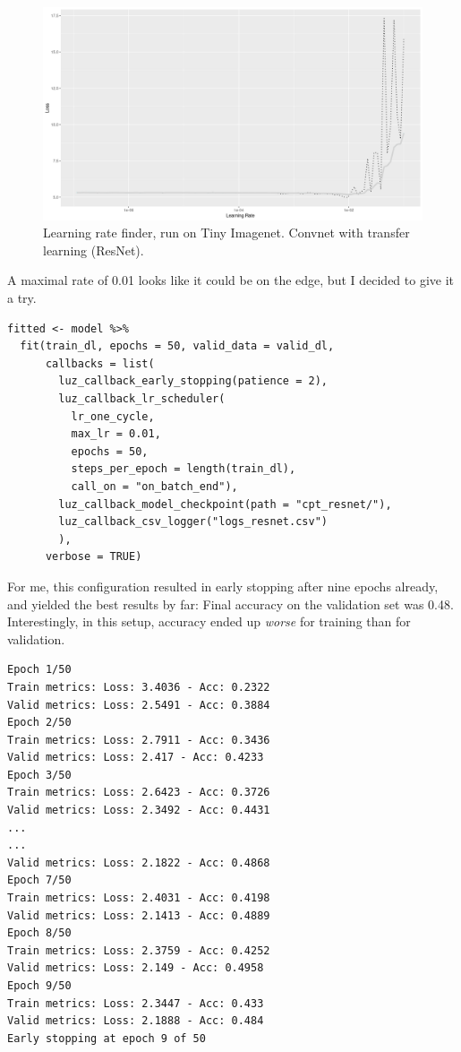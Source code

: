 \documentclass[
  letterpaper,
]{krantz}
\begin{document}
\begin{figure}[H]

{\centering \includegraphics{images/images2-lr-finder-resnet.png}

}

\caption{\label{fig-images2-lr-finder-resnet}Learning rate finder, run
on Tiny Imagenet. Convnet with transfer learning (ResNet).}

\end{figure}

A maximal rate of 0.01 looks like it could be on the edge, but I decided
to give it a try.

\begin{verbatim}
fitted <- model %>%
  fit(train_dl, epochs = 50, valid_data = valid_dl,
      callbacks = list(
        luz_callback_early_stopping(patience = 2),
        luz_callback_lr_scheduler(
          lr_one_cycle,
          max_lr = 0.01,
          epochs = 50,
          steps_per_epoch = length(train_dl),
          call_on = "on_batch_end"),
        luz_callback_model_checkpoint(path = "cpt_resnet/"),
        luz_callback_csv_logger("logs_resnet.csv")
        ),
      verbose = TRUE)
\end{verbatim}

For me, this configuration resulted in early stopping after nine epochs
already, and yielded the best results by far: Final accuracy on the
validation set was 0.48. Interestingly, in this setup, accuracy ended up
\emph{worse} for training than for validation.

\begin{verbatim}
Epoch 1/50
Train metrics: Loss: 3.4036 - Acc: 0.2322                                     
Valid metrics: Loss: 2.5491 - Acc: 0.3884
Epoch 2/50
Train metrics: Loss: 2.7911 - Acc: 0.3436                                     
Valid metrics: Loss: 2.417 - Acc: 0.4233
Epoch 3/50
Train metrics: Loss: 2.6423 - Acc: 0.3726                                     
Valid metrics: Loss: 2.3492 - Acc: 0.4431
...
...
Valid metrics: Loss: 2.1822 - Acc: 0.4868
Epoch 7/50
Train metrics: Loss: 2.4031 - Acc: 0.4198                                     
Valid metrics: Loss: 2.1413 - Acc: 0.4889
Epoch 8/50
Train metrics: Loss: 2.3759 - Acc: 0.4252                                     
Valid metrics: Loss: 2.149 - Acc: 0.4958
Epoch 9/50
Train metrics: Loss: 2.3447 - Acc: 0.433                                      
Valid metrics: Loss: 2.1888 - Acc: 0.484
Early stopping at epoch 9 of 50
\end{verbatim}
\end{document}
